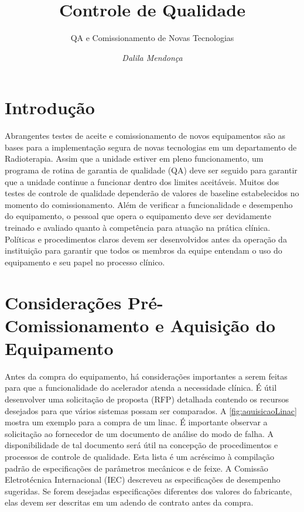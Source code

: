 \documentclass[11pt,a4paper]{article}
\title{\LobsterTwo\Huge{Controle de Qualidade}}
\author{\LobsterTwo\Large{QA e Comissionamento de Novas Tecnologias}\nocite{*}}
\date{\LobsterTwo\textit{Dalila Mendonça}}
\newcounter{exemplo}
\begin{document}
	\maketitle


\section{Introdução}

	Abrangentes testes de aceite e comissionamento de novos equipamentos são as bases para a implementação segura de novas tecnologias em um departamento de Radioterapia. Assim que a unidade estiver em pleno funcionamento, um programa de rotina de garantia de qualidade (QA) deve ser seguido para garantir que a unidade continue a funcionar dentro dos limites aceitáveis. Muitos dos testes de controle de qualidade dependerão de valores de baseline estabelecidos no momento do comissionamento. Além de verificar a funcionalidade e desempenho do equipamento, o pessoal que opera o equipamento deve ser devidamente treinado e avaliado quanto à competência para atuação na prática clínica. Políticas e procedimentos claros devem ser desenvolvidos antes da operação da instituição para garantir que todos os membros da equipe entendam o uso do equipamento e seu papel no processo clínico.

\section{Considerações Pré-Comissionamento e Aquisição do Equipamento}

	Antes da compra do equipamento, há considerações importantes a serem feitas para que a funcionalidade do acelerador atenda a necessidade clínica. É útil desenvolver uma solicitação de proposta (RFP) detalhada contendo os recursos desejados para que vários sistemas possam ser comparados. A \ref{fig:aquisicaoLinac} mostra um exemplo para a compra de um linac. É importante observar a solicitação ao fornecedor de um documento de análise do modo de falha. A disponibilidade de tal documento será útil na concepção de procedimentos e processos de controle de qualidade. Esta lista é um acréscimo à compilação padrão de especificações de parâmetros mecânicos e de feixe. A Comissão Eletrotécnica Internacional (IEC) descreveu as especificações de desempenho sugeridas. Se forem desejadas especificações diferentes dos valores do fabricante, elas devem ser descritas em um adendo de contrato antes da compra.
\end{document}
